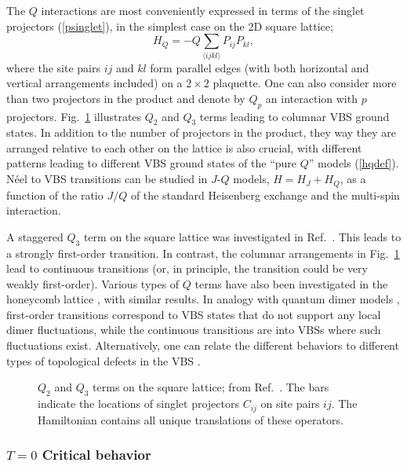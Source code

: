 \documentclass[range]{ar2e}
\begin{document}
The $Q$ interactions are most conveniently expressed in terms of the singlet projectors (\ref{psinglet}), in the simplest case on the 2D square lattice;
\begin{equation}
H_Q = - Q\sum_{\langle ijkl\rangle } P_{ij}P_{kl},
\label{hqdef}
\end{equation}
where the site pairs $ij$ and $kl$ form parallel edges (with both horizontal and vertical arrangements included) on a $2\times 2$ plaquette. 
One can also consider more than two projectors in the product and denote by $Q_p$ an interaction with $p$ projectors. Fig.~\ref{qterms} illustrates $Q_2$ 
and $Q_3$ terms leading to columnar VBS ground states. In addition to the number of projectors in the product, they way they are arranged relative to each 
other on the lattice is also crucial, with different patterns leading to different VBS ground states of the ``pure $Q$'' models (\ref{hqdef}). N\'eel to 
VBS transitions can be studied in $J$-$Q$ models, $H=H_J+H_Q$, as a function of the ratio $J/Q$ of the standard Heisenberg exchange and the multi-spin 
interaction.

A staggered $Q_3$ term on the square lattice was investigated in Ref.~\cite{Sen10}. This leads to a strongly first-order transition. In contrast, 
the columnar arrangements in Fig.~\ref{qterms} lead to continuous transitions (or, in principle, the transition could be very weakly first-order). 
Various types of $Q$ terms have also been investigated in the honeycomb lattice \cite{Banerjee11}, with similar results. In analogy with quantum 
dimer models \cite{Rokhsar88,Moessner01}, first-order transitions correspond to VBS states that do not support any local dimer fluctuations, while 
the continuous transitions are into VBSs where such fluctuations exist. Alternatively, one can relate the different behaviors to different types of 
topological defects in the VBS \cite{levin2004:vbs,Banerjee11}.

\begin{figure}
\centerline{}
\caption{$Q_2$ and $Q_3$ terms on the square lattice; from Ref.~\cite{Sandvik12}. The bars indicate the locations of singlet projectors 
$C_{ij}$ on site pairs $ij$. The Hamiltonian contains all unique translations of these operators.}
\label{qterms}
\end{figure}

\subsubsection{$T=0$ Critical behavior}
\end{document}
